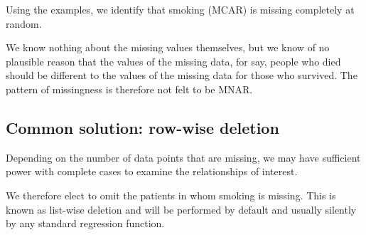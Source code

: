 \documentclass[
  12pt,
  krantz2]{krantz}
\makeatletter
\newenvironment{Shaded}{\begin{snugshade}}{\end{snugshade}}
\newcommand{\KeywordTok}[1]{\textcolor[rgb]{0.13,0.29,0.53}{\textbf{#1}}}
\newcommand{\NormalTok}[1]{#1}
\newcommand{\OperatorTok}[1]{\textcolor[rgb]{0.81,0.36,0.00}{\textbf{#1}}}
\newcommand{\StringTok}[1]{\textcolor[rgb]{0.31,0.60,0.02}{#1}}
\newenvironment{kframe}{%
\medskip{}
\setlength{\fboxsep}{.8em}
 \def\at@end@of@kframe{}%
 \ifinner\ifhmode%
  \def\at@end@of@kframe{\end{minipage}}%
  \begin{minipage}{\columnwidth}%
 \fi\fi%
 \def\FrameCommand##1{\hskip\@totalleftmargin \hskip-\fboxsep
 \colorbox{shadecolor}{##1}\hskip-\fboxsep
     \hskip-\linewidth \hskip-\@totalleftmargin \hskip\columnwidth}%
 \MakeFramed {\advance\hsize-\width
   \@totalleftmargin\z@ \linewidth\hsize
   \@setminipage}}%
 {\par\unskip\endMakeFramed%
 \at@end@of@kframe}
\renewenvironment{Shaded}{\begin{kframe}}{\end{kframe}}
\makeatother
\begin{document}
Using the examples, we identify that smoking (MCAR) is missing completely at random.

We know nothing about the missing values themselves, but we know of no plausible reason that the values of the missing data, for say, people who died should be different to the values of the missing data for those who survived.
The pattern of missingness is therefore not felt to be MNAR.

\hypertarget{common-solution-row-wise-deletion}{%
\subsection{Common solution: row-wise deletion}\label{common-solution-row-wise-deletion}}

Depending on the number of data points that are missing, we may have sufficient power with complete cases to examine the relationships of interest.

We therefore elect to omit the patients in whom smoking is missing.
This is known as list-wise deletion and will be performed by default and usually silently by any standard regression function.

\begin{Shaded}
\end{Shaded}
\end{document}
